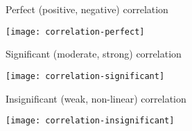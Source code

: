 \documentclass[t]{beamer}
\begin{document}

	\begin{frame}[c]{Perfect (positive, negative) correlation}
			
		\begin{center}
			\texttt{[image: correlation-perfect]}		
		\end{center}

	\end{frame}	

	\begin{frame}[c]{Significant (moderate, strong) correlation}
			
		\begin{center}
			\texttt{[image: correlation-significant]}		
		\end{center}

	\end{frame}	

	\begin{frame}[c]{Insignificant (weak, non-linear) correlation}
			
		\begin{center}
			\texttt{[image: correlation-insignificant]}		
		\end{center}

	\end{frame}
	
\end{document}
